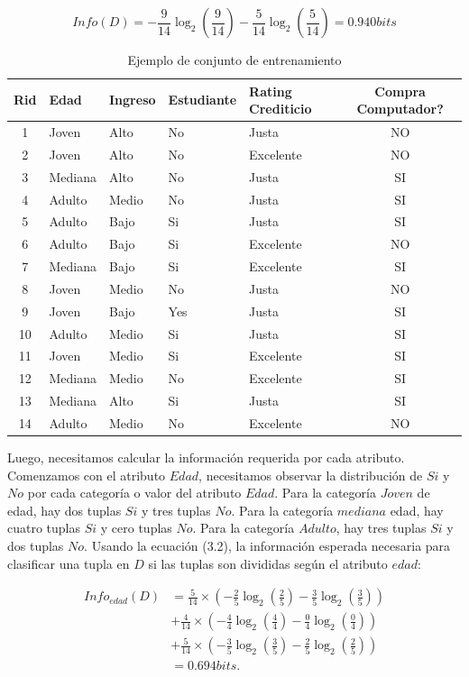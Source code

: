 \[
Info(D)=-\frac{9}{14}\log_{2}(\frac{9}{14})-\frac{5}{14}\log_{2}(\frac{5}{14})=0.940bits
\]

\begin{table}[htbp]
\begin{centering}
\begin{tabular}{|c|l|l|l|l|c|}
\hline 
\textbf{Rid}  & \textbf{Edad}  & \textbf{Ingreso}  & \textbf{Estudiante}  & \textbf{Rating Crediticio}  & \textbf{Compra Computador?} \tabularnewline
\hline 
\hline 
1  & Joven  & Alto  & No  & Justa  & NO \tabularnewline
2  & Joven  & Alto  & No  & Excelente  & NO \tabularnewline
3  & Mediana  & Alto  & No  & Justa  & SI \tabularnewline
4  & Adulto  & Medio  & No  & Justa  & SI \tabularnewline
5  & Adulto  & Bajo  & Si  & Justa  & SI \tabularnewline
6  & Adulto  & Bajo  & Si  & Excelente  & NO \tabularnewline
7  & Mediana  & Bajo  & Si  & Excelente  & SI \tabularnewline
8  & Joven  & Medio  & No  & Justa  & NO \tabularnewline
9  & Joven  & Bajo  & Yes  & Justa  & SI \tabularnewline
10  & Adulto  & Medio  & Si  & Justa  & SI \tabularnewline
11  & Joven  & Medio  & Si  & Excelente  & SI \tabularnewline
12  & Mediana  & Medio  & No  & Excelente  & SI \tabularnewline
13  & Mediana  & Alto  & Si  & Justa  & SI \tabularnewline
14  & Adulto  & Medio  & No  & Excelente  & NO \tabularnewline
\hline 
\end{tabular}
\par\end{centering}
\centering{}\caption{\label{tabla:sencilla2}Ejemplo de conjunto de entrenamiento}
\end{table}

Luego, necesitamos calcular la información requerida por cada atributo.
Comenzamos con el atributo $Edad$, necesitamos observar la distribución
de $Si$ y $No$ por cada categoría o valor del atributo $Edad$.
Para la categoría $Joven$ de edad, hay dos tuplas $Si$ y tres tuplas
$No$. Para la categoría $mediana$ edad, hay cuatro tuplas $Si$
y cero tuplas $No$. Para la categoría $Adulto$, hay tres tuplas
$Si$ y dos tuplas $No$. Usando la ecuación (3.2), la información
esperada necesaria para clasificar una tupla en $D$ si las tuplas
son divididas según el atributo $edad$:

\[
\begin{split}Info_{edad}(D) & =\frac{5}{14}\times(-\frac{2}{5}\log_{2}(\frac{2}{5})-\frac{3}{5}\log_{2}(\frac{3}{5}))\\
 & +\frac{4}{14}\times(-\frac{4}{4}\log_{2}(\frac{4}{4})-\frac{0}{4}\log_{2}(\frac{0}{4}))\\
 & +\frac{5}{14}\times(-\frac{3}{5}\log_{2}(\frac{3}{5})-\frac{2}{5}\log_{2}(\frac{2}{5}))\\
 & =0.694bits.
\end{split}
\]

